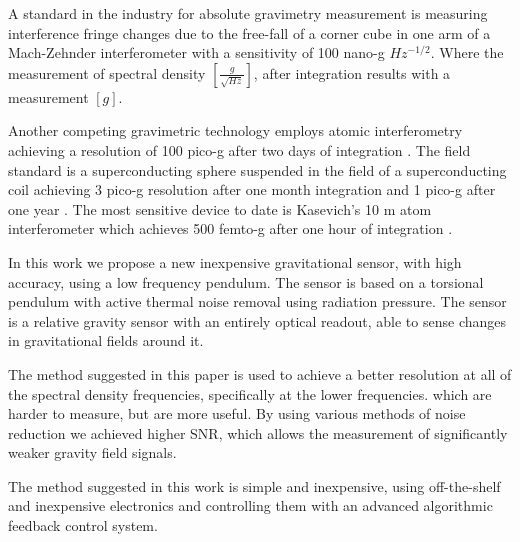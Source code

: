 \documentclass[\main/master.tex]{subfiles}
\begin{document}
\fi
\par\noindent
A standard in the industry for absolute gravimetry measurement is measuring interference fringe changes due to the free-fall of a corner cube in one arm of a Mach-Zehnder interferometer with a sensitivity of 100 nano-g $Hz^{-1/2}$. Where the measurement of spectral density $[\frac{g}{\sqrt{Hz}}]$, after integration results with a measurement $[g]$.
\par\noindent
Another competing gravimetric technology employs atomic interferometry achieving a resolution of 100 pico-g after two days of integration \cite{Peters01}. The field standard is a superconducting sphere suspended in the field of a superconducting coil achieving 3 pico-g resolution after one month integration and 1 pico-g  after one year \cite{Goodkind99}. 
The most sensitive device to date is Kasevich's 10 m atom interferometer which achieves 500 femto-g after one hour of integration \cite{PhysRevA.91.033629,kasevich2014prospects}. 
\par\noindent
In this work we propose a new inexpensive gravitational sensor, with high accuracy, using a low frequency pendulum. The sensor is based on a torsional pendulum with active thermal noise removal using radiation pressure. The sensor is a relative gravity sensor with an entirely optical readout, able to sense changes in gravitational fields around it. 
\iffalse
\fi
\par\noindent
The method suggested in this paper is used to achieve a better resolution at all of the spectral density frequencies, specifically at the lower frequencies. which are harder to measure, but are more useful. By using various methods of noise reduction we achieved higher SNR, which allows the measurement of significantly weaker gravity field signals.
\par\noindent
The method suggested in this work is simple and inexpensive, using off-the-shelf and inexpensive electronics and controlling them with an advanced algorithmic feedback control system.
 
\end{document}
